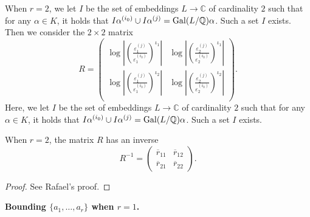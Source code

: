 When $r = 2$, we let $I$ be the set of embeddings $L \to \mathbb{C}$ of cardinality $2$ such that for any $\alpha \in K$, it holds that $I\alpha^{(i_0)} \cup I\alpha^{(j)} = \operatorname{Gal}(L/\mathbb{Q})\alpha$. Such a set $I$ exists. Then we consider the $2 \times 2$ matrix
\[R = \begin{pmatrix}
	\log\left|\left(\frac{\varepsilon_1^{(j)}}{\varepsilon_1^{(i_0)}}\right)^{\iota_1}\right| &
	\log\left|\left(\frac{\varepsilon_2^{(j)}}{\varepsilon_2^{(i_0)}}\right)^{\iota_1}\right|\\
	\log\left|\left(\frac{\varepsilon_1^{(j)}}{\varepsilon_1^{(i_0)}}\right)^{\iota_2}\right| &
	\log\left|\left(\frac{\varepsilon_2^{(j)}}{\varepsilon_2^{(i_0)}}\right)^{\iota_2}\right|\\
	\end{pmatrix}.\]
Here, we let $I$ be the set of embeddings $L \to \mathbb{C}$ of cardinality $2$ such that for any $\alpha \in K$, it holds that $I\alpha^{(i_0)} \cup I\alpha^{(j)} = \operatorname{Gal}(L/\mathbb{Q})\alpha$. Such a set $I$ exists. 
\begin{lemma}
When $r = 2$, the matrix $R$ has an inverse
\[R^{-1} = \begin{pmatrix}
	\overline{r}_{11} & \overline{r}_{12} \\
	\overline{r}_{21} & \overline{r}_{22}
\end{pmatrix}.\]
\end{lemma}
	
\begin{proof}
See Rafael's proof.
\end{proof}

\textbf{Bounding $\{a_1, \dots, a_r\}$ when $r = 1$.}\\

